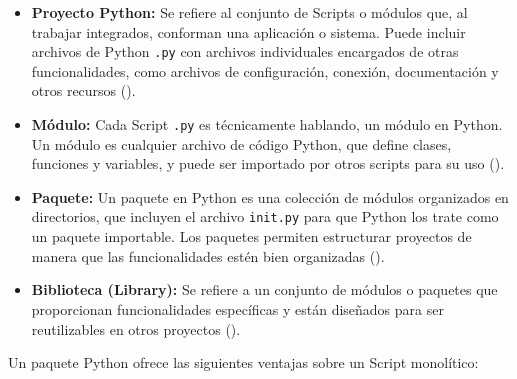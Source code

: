\documentclass[letter,oneside,12pt,spanish]{report}
\begin{document}
\begin{itemize}
    \item \textbf{Proyecto Python:} Se refiere al conjunto de Scripts o módulos que, al trabajar integrados, conforman una aplicación o sistema. Puede incluir archivos de Python \texttt{.py} con archivos individuales encargados de otras funcionalidades, como archivos de configuración, conexión, documentación y otros recursos (\cite{Martelli2006}).

    \item \textbf{Módulo:} Cada Script \texttt{.py} es técnicamente hablando, un módulo en Python. Un módulo es cualquier archivo de código Python, que define clases, funciones y variables, y puede ser importado por otros scripts para su uso (\cite{Pilgrim2004}).

    \item \textbf{Paquete:} Un paquete en Python es una colección de módulos organizados en directorios, que incluyen el archivo \texttt{init.py} para que Python los trate como un paquete importable. Los paquetes permiten estructurar proyectos de manera que las funcionalidades estén bien organizadas (\cite{Beazley2009}).

    \item \textbf{Biblioteca (Library):} Se refiere a un conjunto de módulos o paquetes que proporcionan funcionalidades específicas y están diseñados para ser reutilizables en otros proyectos (\cite{VanRossum2001}).
\end{itemize}

\noindent Un paquete Python ofrece las siguientes ventajas sobre un Script monolítico:
\end{document}
